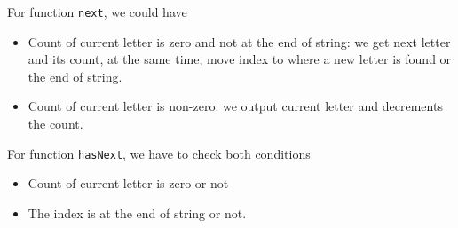 For function \texttt{next}, we could have
\begin{itemize}
\item Count of current letter is zero and not at the end of string: we get next letter and its count, at the same time, move index to where a new letter is found or the end of string.
\item Count of current letter is non-zero: we output current letter and decrements the count.
\end{itemize}

For function \texttt{hasNext}, we have to check both conditions
\begin{itemize}
\item Count of current letter is zero or not
\item The index is at the end of string or not.
\end{itemize}
